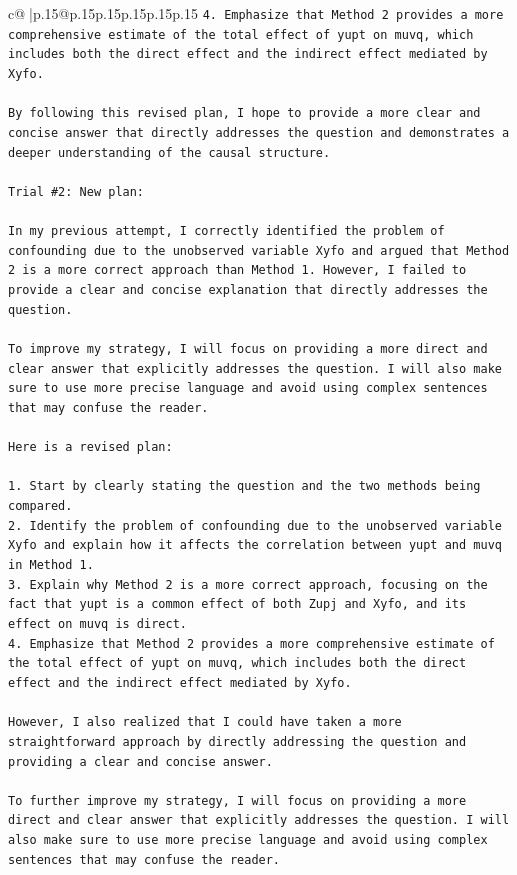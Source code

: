 \documentclass{article}
\begin{document}
{\begin{supertabular}{c@{$\;$}|p{.15\linewidth}@{}p{.15\linewidth}p{.15\linewidth}p{.15\linewidth}p{.15\linewidth}p{.15\linewidth}}
{{{\texttt{4. Emphasize that Method 2 provides a more comprehensive estimate of the total effect of yupt on muvq, which includes both the direct effect and the indirect effect mediated by Xyfo.} \\
\\ 
\texttt{By following this revised plan, I hope to provide a more clear and concise answer that directly addresses the question and demonstrates a deeper understanding of the causal structure.} \\
\\ 
\texttt{Trial \#2: New plan: } \\
\\ 
\texttt{In my previous attempt, I correctly identified the problem of confounding due to the unobserved variable Xyfo and argued that Method 2 is a more correct approach than Method 1. However, I failed to provide a clear and concise explanation that directly addresses the question. } \\
\\ 
\texttt{To improve my strategy, I will focus on providing a more direct and clear answer that explicitly addresses the question. I will also make sure to use more precise language and avoid using complex sentences that may confuse the reader. } \\
\\ 
\texttt{Here is a revised plan:} \\
\\ 
\texttt{1. Start by clearly stating the question and the two methods being compared.} \\
\texttt{2. Identify the problem of confounding due to the unobserved variable Xyfo and explain how it affects the correlation between yupt and muvq in Method 1.} \\
\texttt{3. Explain why Method 2 is a more correct approach, focusing on the fact that yupt is a common effect of both Zupj and Xyfo, and its effect on muvq is direct.} \\
\texttt{4. Emphasize that Method 2 provides a more comprehensive estimate of the total effect of yupt on muvq, which includes both the direct effect and the indirect effect mediated by Xyfo.} \\
\\ 
\texttt{However, I also realized that I could have taken a more straightforward approach by directly addressing the question and providing a clear and concise answer. } \\
\\ 
\texttt{To further improve my strategy, I will focus on providing a more direct and clear answer that explicitly addresses the question. I will also make sure to use more precise language and avoid using complex sentences that may confuse the reader. } \\
}}}
\end{supertabular}}
\end{document}
